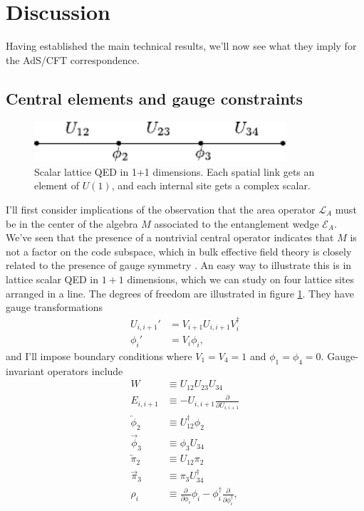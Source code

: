 \documentclass[12pt]{article}
\newcommand{\bfig}{\begin{figure}\begin{center}}
\newcommand{\efig}{\end{center}\end{figure}}
\newcommand{\Ll}{\mathcal{L}}
\newcommand{\LA}{\Ll_A}
\newcommand{\EA}{\mathcal{E}_A}
\begin{document}
\section{Discussion}\label{discussion}
Having established the main technical results, we'll now see what they imply for the AdS/CFT correspondence.  

\subsection{Central elements and gauge constraints}\label{gaugesec}
\bfig
\includegraphics[height=1.5cm]{lattice.pdf}
\caption{Scalar lattice QED in 1+1 dimensions.  Each spatial link gets an element of $U(1)$, and each internal site gets a complex scalar.}\label{latticefig}
\efig
I'll first consider implications of the observation that the area operator $\LA$ must be in the center of the algebra $M$ associated to the entanglement wedge $\EA$.  We've seen that the presence of a nontrivial central operator indicates that $M$ is not a factor on the code subspace, which in bulk effective field theory is closely related to the presence of gauge symmetry \cite{Donnelly:2011hn,Casini:2013rba,Harlow:2014yoa,Radicevic:2015sza,Donnelly:2014fua,Donnelly:2015hxa,Harlow:2015lma,Donnelly:2015hta,Ma:2015xes,Soni:2015yga,Donnelly:2016auv,Donnelly:2016rvo}.  An easy way to illustrate this is in lattice scalar QED in $1+1$ dimensions, which we can study on four lattice sites arranged in a line.  The degrees of freedom are illustrated in figure \ref{latticefig}.  They have gauge transformations
\begin{align}
U_{i,i+1}'&=V_{i+1}U_{i,i+1} V_{i}^\dagger\\
\phi_i'&=V_i\phi_i,
\end{align}
and I'll impose boundary conditions where $V_1=V_4=1$ and $\phi_1=\phi_4=0$.  Gauge-invariant operators include
\begin{align}\nonumber
W&\equiv U_{12} U_{23}U_{34}\\\nonumber
E_{i,i+1}&\equiv - U_{i,i+1}\frac{\partial}{\partial U_{i,i+1}}\\\nonumber
\overleftarrow{\phi}_2&\equiv U_{12}^\dagger \phi_2\\
\overrightarrow{\phi}_3&\equiv \phi_3 U_{34}\\\nonumber
\overleftarrow{\pi}_2&\equiv U_{12} \pi_2\\\nonumber
\overrightarrow{\pi}_3&\equiv \pi_3 U_{34}^\dagger\\\nonumber
\rho_i&\equiv \frac{\partial}{\partial \phi_i} \phi_i-\phi_i^\dagger \frac{\partial}{\partial \phi_i^\dagger},
\end{align}
\end{document}
